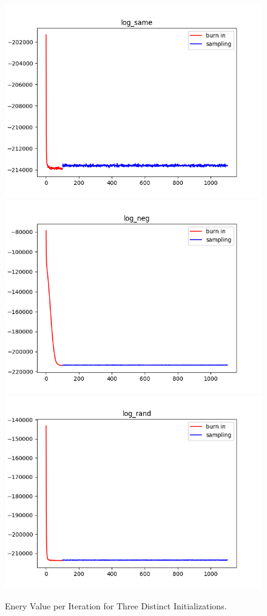 \documentclass[12pt]{article}
\begin{document}
\begin{enumerate}[label=(\alph*)]
\begin{figure}[!ht]
\centering
\includegraphics[scale=0.5]{programming/log_same.png}
\includegraphics[scale=0.5]{programming/log_neg.png}
\includegraphics[scale=0.5]{programming/log_rand.png}
\caption{Enery Value per Iteration for Three Distinct Initializations.}
\label{fig:log_energies}
\end{figure}


\end{enumerate}
\end{document}
